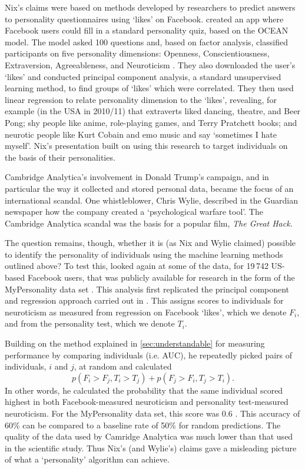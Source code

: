 Nix's claims were based on methods developed by researchers to predict answers to personality questionnaires using `likes' on Facebook. \textcite{youyou2015computer} created an app where Facebook users could fill in a standard personality quiz, based on the OCEAN model. The model asked 100 questions and, based on factor analysis, classified participants on five personality dimensions: Openness, Conscientiousness, Extraversion, Agreeableness, and Neuroticism . They also downloaded the user's `likes' and conducted principal component analysis, a standard unsupervised learning method, to find groups of `likes' which were correlated. They then used linear regression to relate personality dimension to the `likes', revealing, for example (in the USA in 2010/11)  that extraverts liked dancing, theatre, and Beer Pong; shy people like anime, role-playing games, and Terry Pratchett books; and neurotic people like Kurt Cobain and emo music and say `sometimes I hate myself'. Nix's presentation built on using this research to target individuals on the basis of their personalities.

Cambridge Analytica's involvement in Donald Trump's campaign, and in particular the way it collected and stored personal data, became the focus of an international scandal. One whistleblower, Chris Wylie, described in the Guardian newspaper how the company created a `psychological warfare tool'. The Cambridge Analytica scandal was the basis for a popular film, \textit{The Great Hack}.


The question remains, though, whether it is (as Nix and Wylie claimed) possible to identify the personality of individuals using the machine learning methods outlined above? To test this, \textcite{sumpter2018outnumbered} looked again at some of the data, for 19\,742 US-based Facebook users, that was publicly available for research in the form of the MyPersonality data set \parencite{kosinski2016mining}.  This analysis first replicated the principal component and regression approach carried out in \parencite{youyou2015computer}. This assigns scores to individuals for neuroticism as measured from regression on Facebook `likes', which we denote $F_i$, and from the personality test, which we denote $T_i$.

Building on the method explained in \cref{sec:understandable} for measuring performance by comparing individuals (i.e. AUC), he repeatedly picked pairs of individuals, $i$ and $j$, at random and calculated
\begin{equation}
p(F_i>F_j, T_i>T_j) + p(F_j>F_i, T_j>T_i).\label{ch12:eqn12.10}
\end{equation}
In other words, he calculated the probability that the same individual scored highest in both Facebook-measured neuroticism and personality test-measured neuroticism. For the MyPersonality data set, this score was 0.6 \parencite{sumpter2018outnumbered}. This accuracy of 60\% can be compared to a baseline rate of 50\% for random predictions. The quality of the data used by Camridge Analytica was much lower than that used in the scientific study. Thus Nix's (and Wylie's) claims gave a misleading picture of what a `personality' algorithm can achieve.

